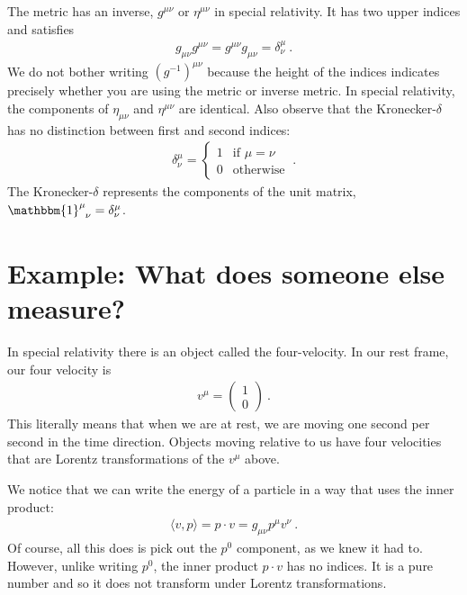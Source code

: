 \documentclass[12pt, oneside]{report}    %
\let\oldsection\section
\def\section{%
  \setcounter{sidenote}{1}%
  \oldsection
}
\begin{document}
The metric has an inverse, $g^{\mu\nu}$ or $\eta^{\mu\nu}$ in special relativity. It has two upper indices and satisfies
\begin{align}
    g_{\mu\nu}g^{\mu\nu} = g^{\mu\nu}g_{\mu\nu} = \delta^\mu_\nu \ .
\end{align}
We do not bother writing $(g^{-1})^{\mu\nu}$ because the height of the indices indicates precisely whether you are using the metric or inverse metric. In special relativity, the components of $\eta_{\mu\nu}$ and $\eta^{\mu\nu}$ are identical. Also observe that the Kronecker-$\delta$ has no distinction between first and second indices:
\begin{align}
    \delta^\mu_\nu =
    \begin{cases}
    1 & \text{if } \mu = \nu \\
    0 & \text{otherwise} 
    \end{cases}
    \ .
\end{align}
The Kronecker-$\delta$ represents the components of the unit matrix, $\mathbbm{1}\aij{\mu}{\nu} = \delta^\mu_\nu$.


\section{Example: What does someone else measure?}
\label{sec:relativity:alien}


In special relativity there is an object called the four-velocity. In our rest frame, our four velocity is
\begin{align}
    v^\mu = \begin{pmatrix}
        1\\ 0
    \end{pmatrix} \ .
    \label{eq:4:velocity:in:rest:Frame}
\end{align}
This literally means that when we are at rest, we are moving one second per second in the time direction. Objects moving relative to us have four velocities that are Lorentz transformations of the $v^\mu$ above. 

We notice that we can write the energy of a particle in a way that uses the inner product:
\begin{align}
    \langle v, p\rangle = p\cdot v = g_{\mu\nu} p^\mu v^\nu \ .
\end{align}
Of course, all this does is pick out the $p^0$ component, as we knew it had to. However, unlike writing $p^0$, the inner product $p\cdot v$ has no indices. It is a pure number and so it does not transform under Lorentz transformations. 
\end{document}
